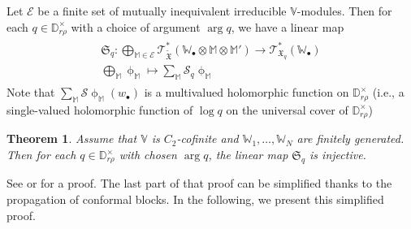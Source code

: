 \documentclass[12pt,a4paper,notitlepage]{article}
\theoremstyle{definition}
\theoremstyle{plain}
\newtheorem{thm}[df]{Theorem}
\newcommand{\fk}{\mathfrak}
\newcommand{\mc}{\mathcal}
\newcommand{\wtd}{\widetilde}
\newcommand{\scr}{\mathscr}
\newcommand{\blt}{\bullet}
\newcommand{\Vbb}{\mathbb V}
\newcommand{\Wbb}{\mathbb W}
\newcommand{\Mbb}{\mathbb M}
\newcommand{\Dbb}{\mathbb D}
\numberwithin{equation}{section}
\begin{document}
Let $\mc E$ be a finite set of mutually inequivalent irreducible $\Vbb$-modules. Then for each $q\in\Dbb_{r\rho}^\times$ with a choice of argument $\arg q$, we have a linear map
\begin{gather}\label{eq254}
\begin{gathered}
\fk S_q:\bigoplus_{\Mbb\in\mc E}\scr T_{\wtd{\fk X}}^*(\Wbb_\blt\otimes\Mbb\otimes\Mbb')\rightarrow\scr T_{\fk X_q}^*(\Wbb_\blt)\\
\bigoplus_\Mbb\upphi_\Mbb\mapsto \sum_\Mbb\mc S_q\upphi_\Mbb
\end{gathered}
\end{gather} 
Note that $\sum_\Mbb\mc S\upphi_\Mbb(w_\blt)$ is a multivalued holomorphic function on $\Dbb_{r\rho}^\times$ (i.e.,  a single-valued holomorphic function of $\log q$ on the universal cover of $\Dbb_{r\rho}^\times$)

\begin{thm}\label{lb172}
Assume that $\Vbb$ is $C_2$-cofinite and $\Wbb_1,\dots,\Wbb_N$ are finitely generated. Then for each $q\in\Dbb_{r\rho}^\times$ with chosen $\arg q$, the linear map $\fk S_q$ is injective.
\end{thm}

See \cite[Sec. 4.4]{Gui} or \cite[Sec. 12]{Gui20} for a proof. The last part of that proof can be simplified thanks to the propagation of conformal blocks. In the following, we present this simplified proof.
\end{document}
